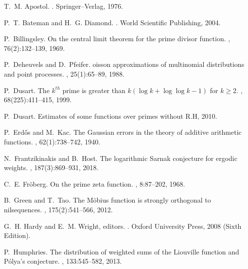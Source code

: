 \documentclass[11pt,reqno,a4letter]{article}
\numberwithin{equation}{section}
\numberwithin{figure}{section}
\numberwithin{table}{section}
\theoremstyle{plain}
\numberwithin{theorem}{section}
\theoremstyle{definition}
\begin{document}
\begin{thebibliography}{10}

T.~M. Apostol.
.
\newblock Springer--Verlag, 1976.

P.~T. Bateman and H.~G. Diamond.
.
\newblock World Scientific Publishing, 2004.

P.~Billingsley.
\newblock On the central limit theorem for the prime divisor function.
, 76(2):132--139, 1969.

P.~Deheuvels and D.~Pfeifer.
oisson approximations of multinomial distributions and point
  processes.
, 25(1):65--89, 1988.

P.~Dusart.
\newblock The $k^{th}$ prime is greater than $k(\log k +\log\log k-1)$ for $k
  \geq 2$.
, 68(225):411--415, 1999.

P.~Dusart.
\newblock Estimates of some functions over primes without {R}.{H}, 2010.

P.~Erd{\H{o}}s and M.~Kac.
\newblock The {G}aussian errors in the theory of additive arithmetic functions.
, 62(1):738--742, 1940.

N.~Frantzikinakis and B.~Host.
\newblock The logarithmic {S}arnak conjecture for ergodic weights.
, 187(3):869--931, 2018.

C.~E. Fr{\"{o}}berg.
\newblock On the prime zeta function.
, 8:87--202, 1968.

B.~Green and T.~Tao.
\newblock The {M}\"{o}bius function is strongly orthogonal to nilsequences.
, 175(2):541--566, 2012.

G.~H. Hardy and E.~M. Wright, editors.
.
\newblock Oxford University Press, 2008 (Sixth Edition).

P.~Humphries.
\newblock The distribution of weighted sums of the {L}iouville function and
  {P}\'{o}lya's conjecture.
, 133:545--582, 2013.


\end{thebibliography}
\end{document}
